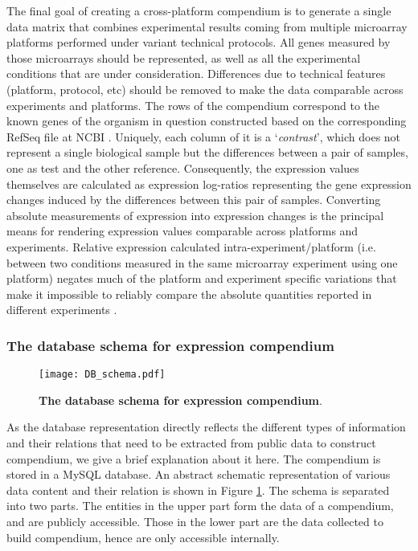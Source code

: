 The final goal of creating a cross-platform compendium is to generate a single
data matrix that combines experimental results coming from multiple microarray
platforms performed under variant technical protocols.  All genes measured by
those microarrays should be represented, as well as all the experimental
conditions that are under consideration.  Differences due to technical features
(platform, protocol, etc) should be removed to make the data comparable across
experiments and platforms.
%
The rows of the compendium correspond to the known genes of the organism in
question constructed based on the corresponding RefSeq file at NCBI
\cite{Pruitt2007}.
%
Uniquely, each column of it is a `\textit{contrast}', which does not represent
a single biological sample but the differences between a pair of samples, one as
test and the other reference.
%
Consequently, the expression values themselves are calculated as expression
log-ratios representing the gene expression changes induced by the differences
between this pair of samples.
%
Converting absolute measurements of expression into expression changes is the
principal means for rendering expression values comparable across platforms and
experiments.
%
Relative expression calculated intra-experiment/platform (i.e. between two
conditions measured in the same microarray experiment using one platform)
negates much of the platform and experiment specific variations that make it
impossible to reliably compare the absolute quantities reported in different
experiments \cite{Shi2006}.



\subsubsection{The database schema for expression compendium}\label{sec:command-db-schema}

\begin{figure}
  \centering
  \texttt{[image: DB\_schema.pdf]}
  \caption[The database schema for expression compendium]{ \textbf{The
      database schema for expression compendium}.
  }
  \label{fig:comp-db-schema}
\end{figure}

As the database representation directly reflects the different types of
information and their relations that need to be extracted from public data to
construct compendium, we give a brief explanation about it here.
%
The compendium is stored in a MySQL database. An abstract schematic
representation of various data content and their relation is shown in Figure
\ref{fig:comp-db-schema}.
%
The schema is separated into two parts. The entities in the upper part form
the data of a compendium, and are publicly accessible.
%
Those in the lower part are the data collected to build compendium, hence are
only accessible internally.

